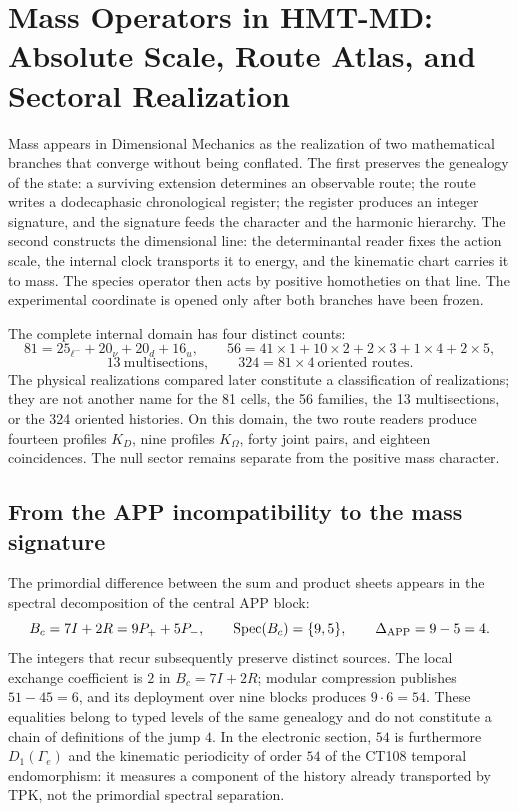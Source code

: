 \section{Mass Operators in HMT-MD: Absolute Scale, Route Atlas, and Sectoral Realization}
\label{sec:tabla-completa-masas-hmt-sm-revfinal}

Mass appears in Dimensional Mechanics as the realization of two
mathematical branches that converge without being conflated. The first preserves the genealogy of the
state: a surviving extension determines an observable route; the route writes
a dodecaphasic chronological register; the register produces an integer signature, and the signature
feeds the character and the harmonic hierarchy. The second constructs the
dimensional line: the determinantal reader fixes the action scale, the internal clock
transports it to energy, and the kinematic chart carries it to mass. The species operator
then acts by positive homotheties on that line. The experimental coordinate
is opened only after both branches have been frozen.

The complete internal domain has four distinct counts:
\begin{equation}
 81=25_{\ell^-}+20_{\nu}+20_d+16_u,\qquad
 56=41\!\times\!1+10\!\times\!2+2\!\times\!3+1\!\times\!4+2\!\times\!5,
 \label{eq:censos-81-56-masas-rectoras}
\end{equation}
\begin{equation}
 13\ \text{multisections},\qquad
 324=81\times4\ \text{oriented routes}.
 \label{eq:censos-13-324-masas-rectoras}
\end{equation}
The physical realizations compared later constitute a
classification of realizations; they are not another name for the 81 cells, the 56
families, the 13 multisections, or the 324 oriented histories. On this domain,
the two route readers produce fourteen profiles \(K_D\), nine profiles
\(K_\Omega\), forty joint pairs, and eighteen coincidences. The null sector
remains separate from the positive mass character.

\subsection{From the APP incompatibility to the mass signature}

The primordial difference between the sum and product sheets appears in the
spectral decomposition of the central APP block:
\begin{equation}
 B_c=7I+2R=9P_++5P_-,\qquad
 \operatorname{Spec}(B_c)=\{9,5\},\qquad
 \Delta_{\rm APP}=9-5=4.
 \label{eq:salto-app-cuatro-ley-masas}
\end{equation}
The integers that recur subsequently preserve distinct sources. The local
exchange coefficient is \(2\) in \(B_c=7I+2R\); modular compression publishes
\(51-45=6\), and its deployment over nine blocks produces \(9\cdot6=54\). These
equalities belong to typed levels of the same genealogy and do not constitute
a chain of definitions of the jump \(4\). In the electronic section, \(54\) is
furthermore \(D_1(\Gamma_e)\) and the kinematic periodicity of order \(54\) of the
CT108 temporal endomorphism: it measures a component of the history already transported
by TPK, not the primordial spectral separation.

